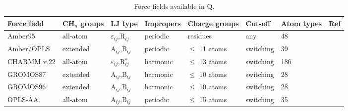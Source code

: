 \documentclass[a4paper,10pt]{article}
\begin{document}
\begin{table}[htbp]
\small \caption{Force fields available in Q.} \label{tab:FF}
\begin{tabularx}{\textwidth}{|p{58pt}|p{40pt}|p{32pt}|p{50pt}|p{50pt}|l|p{27pt}|X|}
\hline \bf{Force field}\footnotemark[1] & \bf{CH$_n$
groups}\footnotemark[2] & \bf{LJ type}\footnotemark[3]
 & \bf{Impropers}\footnotemark[4] & \bf{Charge groups}\footnotemark[5] & \bf{Cut-off}\footnotemark[6]
 & \bf{Atom types}\footnotemark[7] & \bf{Ref}\\
\hline Amber95     & all-atom & $\varepsilon_{ij}$,R$_{ij}$     & periodic & residues        & any       & 48  & \cite{Cornell:1995} \\
\hline Amber/OPLS  & extended & A$_{ij}$,B$_{ij}$               & periodic & $\leq$ 11 atoms & switching & 39  & \cite{Jorgensen:1988} \\
\hline CHARMM v.22 & all-atom & $\varepsilon_{ij}$,R$_{ij}^{*}$ & harmonic & $\leq$ 13 atoms & switching & 186 & \cite{Brooks:1993} \\
\hline GROMOS87    & extended & A$_{ij}$,B$_{ij}$               & harmonic & $\leq$ 10 atoms & switching & 28  & \cite{Gunsteren:1987,Gunsteren:mod} \\
\hline GROMOS96    & extended & A$_{ij}$,B$_{ij}$               & harmonic & $\leq$ 10 atoms & switching & 28  & \cite{Gunsteren:1996} \\
\hline OPLS-AA     & all-atom & A$_{ij}$,B$_{ij}$               & periodic & $\leq$ 15 atoms & switching & 35  & \cite{Jorgensen:1988}\\
\hline
\end{tabularx}
\normalsize
\end{table}




\end{document}
